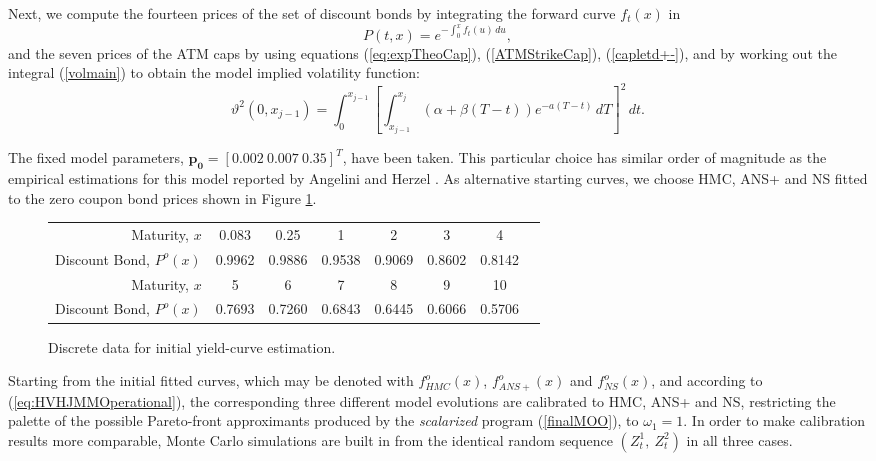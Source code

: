 Next, we compute the fourteen prices of the set of discount bonds by
integrating the forward curve $f_t(x)$ in  
$$
P(t,x)= e^{-\int_0^x f_t(u)\,du},
$$
and the seven prices of the ATM caps by using equations
(\ref{eq:expTheoCap}), (\ref{ATMStrikeCap}), (\ref{capletd+-}), and 
by working out the integral (\ref{volmain}) to obtain the model implied
volatility function:
\begin{equation}
\vartheta^2(0,x_{j-1}) = \int_0^{x_{j-1}} \left[ \int_{x_{j-1}}^{x_j}
  ( \alpha+\beta(T-t) ) e^{-a(T-t)}\,dT \right]^2\,dt.
\end{equation}

 

The fixed model parameters, $\boldsymbol {p_0}=[ 0.002\:0.007\:0.35]^T$, have been
taken. This particular choice has similar order of magnitude as the
empirical estimations for this model reported by Angelini and Herzel
\cite{AH:2005}. As alternative starting curves, we choose HMC, ANS+
and NS fitted to the zero coupon bond prices shown in Figure
\ref{ZeroCoupon}.  

\begin{figure}[h!]
\caption{Discrete data for initial yield-curve estimation.\label{ZeroCoupon}} 
\begin{center}
\begin{tabular}{r|ccccccc}
\hline\hline
{\sc Maturity, $x$} & 0.083 & 0.25 & 1 & 2 & 3 & 4\\
{\sc Discount Bond, $P^o(x)$} & 0.9962 & 0.9886 & 0.9538 & 0.9069 & 0.8602 & 0.8142\\
\hline
{\sc Maturity, $x$}& 5& 6& 7& 8& 9 & 10\\
{\sc Discount Bond, $P^o(x)$}  &  0.7693 & 0.7260 & 0.6843 & 0.6445 &
0.6066 & 0.5706 \\
\hline
\end{tabular}
\end{center}
\end{figure}

Starting from the initial fitted curves, which may be denoted with
$f^o_{HMC}(x)$, $f^o_{ANS+}(x)$ and $f^o_{NS}(x)$, and according to
(\ref{eq:HVHJMMOperational}), the corresponding three different model
evolutions are calibrated to HMC, ANS+ and NS, restricting the palette
of the possible Pareto-front approximants produced by the {\sl scalarized} program
(\ref{finalMOO}), to $\omega_1=1$. In order to make calibration
results more comparable, Monte Carlo simulations are built in from
the identical random sequence $(Z^1_t,~Z^2_t)$ in all three cases. 

